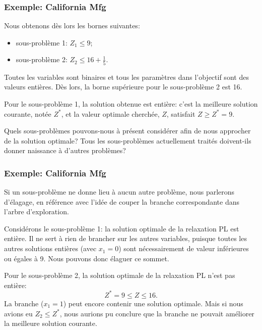 \documentclass[usepdftitle=false]{beamer}
\begin{document}
\begin{frame}
\frametitle{Exemple: California Mfg}

Nous obtenons dès lors les bornes suivantes:
\begin{itemize}
\item
sous-problème 1: $Z_1 \leq 9$;
\item
sous-problème 2: $Z_2 \leq 16+\frac{1}{5}$.
\end{itemize}

\mbox{}

Toutes les variables sont binaires et tous les paramètres dans l'objectif sont des valeurs entières. Dès lors, la borne supérieure pour le sous-problème 2 est 16.

\mbox{}

Pour le sous-problème 1, la solution obtenue est entière: c'est la meilleure solution courante, notée $Z^*$, et la valeur optimale cherchée, $Z$, satisfait $Z \geq Z^* = 9$.

\mbox{}

Quels sous-problèmes pouvons-nous à présent considérer afin de nous approcher de la solution optimale? Tous les sous-problèmes actuellement traités doivent-ils donner naissance à d'autres problèmes?

\end{frame}

\begin{frame}
\frametitle{Exemple: California Mfg}

Si un sous-problème ne donne lieu à aucun autre problème, nous parlerons d'élagage, en référence avec l'idée de couper la branche correspondante dans l'arbre d'exploration.

\mbox{}

Considérons le sous-problème 1: la solution optimale de la relaxation PL est entière.
Il ne sert à rien de brancher sur les autres variables, puisque toutes les autres solutions entières (avec $x_1 = 0$) sont nécessairement de valeur inférieures ou égales à 9.
Nous pouvons donc élaguer ce sommet.

\mbox{}

Pour le sous-problème 2, la solution optimale de la relaxation PL n'est pas entière:
\[
Z^* = 9 \leq Z \leq 16.
\]
La branche ($x_1 = 1$) peut encore contenir une solution optimale.
Mais si nous avions eu $Z_2 \leq Z^*$, nous aurions pu conclure que la
branche ne pouvait améliorer la meilleure solution courante.

\end{frame}
\end{document}
